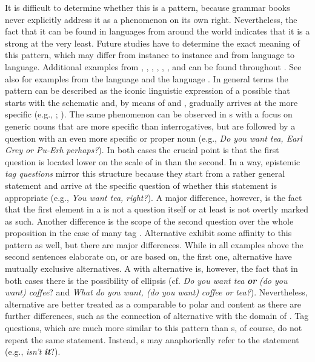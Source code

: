 \noindent It is difficult to determine whether this is a  pattern, because grammar books never explicitly address it as a phenomenon on its own right. Nevertheless, the fact that it can be found in languages from around the world indicates that it is a strong  at the very least. Future studies have to determine the exact meaning of this pattern, which may differ from instance to instance and from language to language. Additional examples from , , , , , , and  can be found throughout . See also  for examples from the  language  and the  language . In general terms the pattern can be described as the iconic linguistic expression of a possible  that starts with the schematic and, by means of  and , gradually arrives at the more specific (e.g., \citealt{Bar2009}; \citealt{Barsalou2009}). The same phenomenon can be observed in s with a focus on generic nouns that are more specific than interrogatives, but are followed by a question with an even more specific or proper noun (e.g., \textit{Do you want tea}\textit{, Earl Grey} \textit{or Pu-Erh} \textit{perhaps?}). In both cases the crucial point is that the first question is located lower on the scale of  in  than the second. In a way, epistemic \textit{tag questions} mirror this structure because they start from a rather general statement and arrive at the specific question of whether this statement is appropriate (e.g., \textit{You want tea,} \textit{right?}). A major difference, however, is the fact that the first element in a  is not a question itself or at least is not overtly marked as such. Another difference is the scope of the second question over the whole proposition in the case of many tag . Alternative  exhibit some affinity to this pattern as well, but there are major differences. While in all examples above the second sentences elaborate on, or are based on, the first one, alternative  have mutually exclusive alternatives. A  with alternative  is, however, the fact that in both cases there is the possibility of ellipsis (cf. \textit{Do you want tea} \textbf{\textit{or}} \textit{(do you want) coffee}? and \textit{What do you want, (do you want)} \textit{coffee or} \textit{tea?}). Nevertheless, alternative  are better treated as a  comparable to polar and content  as there are further differences, such as the connection of alternative  with the domain of . Tag questions, which are much more similar to this pattern than s, of course, do not repeat the same statement. Instead, s may anaphorically refer to the statement (e.g., \textit{isn’t} \textbf{\textit{it}}?).

